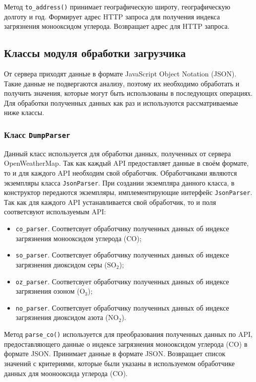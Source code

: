 Метод \texttt{to\_address()} принимает географическую широту, географическую долготу и год.
Формирует адрес HTTP запроса для получения индекса загрязнения монооксидом углерода.
Возвращает адрес для HTTP запроса.




\subsection{Классы модуля обработки загрузчика}
От сервера приходят данные в формате JavaScript Object Notation (JSON).
Такие данные не подвергаются анализу, поэтому их необходимо обработать и получить значения, которые могут быть использованы в последующих операциях.
Для обработки полученных данных как раз и используются рассматриваемые ниже классы.

\subsubsection{Класс \texttt{DumpParser}}
Данный класс используется для обработки данных, полученных от сервера OpenWeatherMap.
Так как каждый API предоставляет данные в своём формате, то и для каждого API необходим свой обработчик.
Обработчиками являются экземпляры класса \texttt{JsonParser}.
При создании экземпляра данного класса, в конструктор передаются экземпляры, имплементирующие интерфейс \texttt{JsonParser}.
Так как для каждого API устанавливается свой обработчик, то и поля соответсвуют используемым API:
\begin{itemize}
    \item \texttt{co\_parser}. Соответсвует обработчику полученных данных об индексе загрязнения монооксидом углерода ($ \text{CO} $);
    \item \texttt{so\_parser}. Соответсвует обработчику полученных данных об индексе загрязнения диоксидом серы ($ \text{SO}_{\text{2}} $);
    \item \texttt{oz\_parser}. Соответсвует обработчику полученных данных об индексе загрязнения озоном ($ \text{O}_{\text{3}} $);
    \item \texttt{no\_parser}. Соответсвует обработчику полученных данных об индексе загрязнения диоксидом азота ($ \text{NO}_{\text{2}} $).
\end{itemize}

Метод \texttt{parse\_co()} используется для преобразования полученных данных по API, предоставляющего данные о индексе загрязнения монооксидом углерода ($ \text{CO} $) в формате JSON.
Принимает данные в формате JSON.
Возвращает список значений с критериями, которые были указаны в используемом обработчике данных для моонооксида углерода ($ \text{CO} $).


